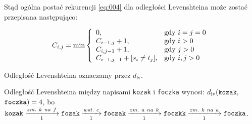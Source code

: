 \documentclass{praca1}
\begin{document}
Stąd ogólna postać rekurencji \ref{eq:004} dla odległości Levenshteina może zostać przepisana następująco:

\begin{equation}
\label{eq:006}
C_{i,j} = \min\left\{
\begin{array}{l l}     
    0, & \text{gdy } i = j = 0\\
    C_{i-1, j} + 1, & \text{gdy } i > 0 \\
    C_{i, j-1} + 1, & \text{gdy } j > 0 \\
    C_{i-1, j-1} + [s_{i}\neq t_{j}], & \text{gdy } i, j > 0
\end{array}\right.
\end{equation}

Odległość Levenshteina oznaczamy przez $d_{\mathrm{lv}}$.



\begin{example}
Odległość Levenshteina między napisami \verb|kozak| i \verb|foczka| wynosi: $d_{\mathrm{lv}}(\verb|kozak|,$ $\verb|foczka|) = 4$, bo $\verb|kozak| \xrightarrow[1]{zm.\ k\ na\ f} \verb|fozak|  \xrightarrow[1]{wst.\ c} \verb|foczak| \xrightarrow[1]{zm.\ a\ na\ k} \verb|foczkk| \xrightarrow[1]{zm.\ k\ na\ a} \verb|foczka|$.
\end{example}
\end{document}
